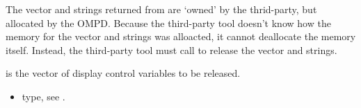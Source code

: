 \descr
The vector and strings returned from 
are `owned' by the thrid-party, but allocated by the OMPD.
Because the third-party tool doesn't know how the memory for the vector
and strings was alloacted, it cannot deallocate the memory itself.
Instead, the third-party tool must call
 to release the vector
and strings.

\argdesc
{} is the vector of display control variables to be released.

\crossreferences
\begin{itemize}
	\item {} type, see .
\end{itemize}
